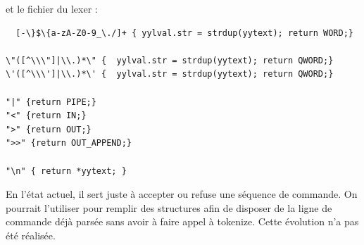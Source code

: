\documentclass[fr]{article}
\begin{document}
et le fichier du lexer :

\begin{lstlisting}
  [-\}$\{a-zA-Z0-9_\./]+ { yylval.str = strdup(yytext); return WORD;}

\"([^\\\"]|\\.)*\" {  yylval.str = strdup(yytext); return QWORD;}
\'([^\\\']|\\.)*\' {  yylval.str = strdup(yytext); return QWORD;}

"|" {return PIPE;}
"<" {return IN;}
">" {return OUT;}
">>" {return OUT_APPEND;}

"\n" { return *yytext; } 
\end{lstlisting}
En l'état actuel, il sert juste à accepter ou refuse une séquence de
commande. On pourrait l'utiliser pour remplir des structures afin de 
disposer de la ligne de commande déjà parsée sans avoir à faire appel
à tokenize. Cette évolution n'a pas été réalisée.
\end{document}
